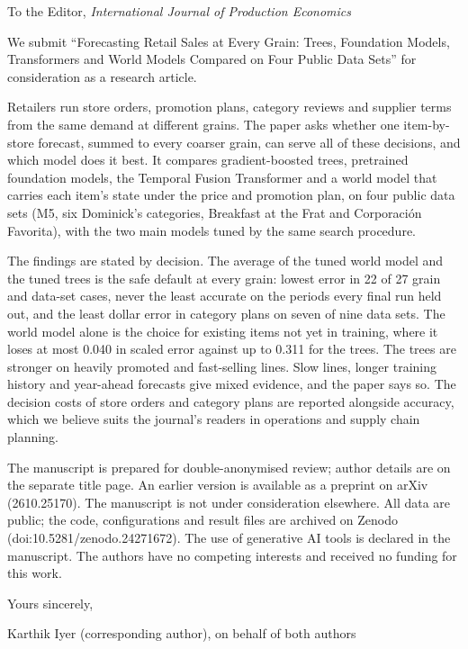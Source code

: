 \documentclass[11pt]{article}
\begin{document}
To the Editor, \emph{International Journal of Production Economics}

We submit ``Forecasting Retail Sales at Every Grain: Trees, Foundation Models, Transformers and World Models
Compared on Four Public Data Sets'' for consideration as a research article.

Retailers run store orders, promotion plans, category reviews and supplier terms from the same demand at
different grains. The paper asks whether one item-by-store forecast, summed to every coarser grain, can serve
all of these decisions, and which model does it best. It compares gradient-boosted trees, pretrained
foundation models, the Temporal Fusion Transformer and a world model that carries each item's state under the
price and promotion plan, on four public data sets (M5, six Dominick's categories, Breakfast at the Frat and
Corporaci\'on Favorita), with the two main models tuned by the same search procedure.

The findings are stated by decision. The average of the tuned world model and the tuned trees is the safe
default at every grain: lowest error in 22 of 27 grain and data-set cases, never the least accurate on the
periods every final run held out, and the least dollar error in category plans on seven of nine data sets. The
world model alone is the choice for existing items not yet in training, where it loses at most 0.040 in scaled
error against up to 0.311 for the trees. The trees are stronger on heavily promoted and fast-selling lines.
Slow lines, longer training history and year-ahead forecasts give mixed evidence, and the paper says so. The
decision costs of store orders and category plans are reported alongside accuracy, which we believe suits the
journal's readers in operations and supply chain planning.

The manuscript is prepared for double-anonymised review; author details are on the separate title page. An
earlier version is available as a preprint on arXiv (2610.25170). The manuscript is not under consideration
elsewhere. All data are public; the code, configurations and result files are archived on Zenodo
(doi:10.5281/zenodo.24271672). The use of generative AI tools is declared in the manuscript. The authors have no
competing interests and received no funding for this work.

Yours sincerely,

Karthik Iyer (corresponding author), on behalf of both authors\\
\corrEmail
\end{document}

